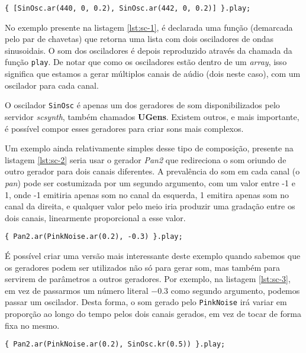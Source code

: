 \begin{lstlisting}[caption={Declaração de dois canais de aúdio com base em dois osciladores},label={lst:sc-1}]
{ [SinOsc.ar(440, 0, 0.2), SinOsc.ar(442, 0, 0.2)] }.play;
\end{lstlisting}

No exemplo presente na listagem \ref{lst:sc-1}, é declarada uma função (demarcada pelo par de chavetas) que retorna uma lista com dois osciladores de ondas sinusoidais. O som dos osciladores é depois reproduzido através da chamada da função \texttt{play}. De notar que como os osciladores estão dentro de um \textit{array}, isso significa que estamos a gerar múltiplos canais de aúdio (dois neste caso), com um oscilador para cada canal.

O oscilador \texttt{SinOsc} é apenas um dos geradores de som disponibilizados pelo servidor \textit{scsynth}, também chamados \textbf{UGens}. Existem outros, e mais importante, é possível compor esses geradores para criar sons mais complexos.

Um exemplo ainda relativamente simples desse tipo de composição, presente na listagem \ref{lst:sc-2} seria usar o gerador \textit{Pan2} que redireciona o som oriundo de outro gerador para dois canais diferentes. A prevalência do som em cada canal (o \textit{pan}) pode ser costumizada por um segundo argumento, com um valor entre -1 e 1, onde -1 emitiria apenas som no canal da esquerda, 1 emitira apenas som no canal da direita, e qualquer valor pelo meio iria produzir uma gradação entre os dois canais, linearmente proporcional a esse valor.

\begin{lstlisting}[caption={Dividir um gerador por dois canais de forma desigual},label={lst:sc-2}]
{ Pan2.ar(PinkNoise.ar(0.2), -0.3) }.play;
\end{lstlisting}

É possível criar uma versão mais interessante deste exemplo quando sabemos que os geradores podem ser utilizados não só para gerar som, mas também para servirem de parâmetros a outros geradores. Por exemplo, na listagem \ref{lst:sc-3}, em vez de passarmos um número literal $-0.3$ como segundo argumento, podemos passar um oscilador. Desta forma, o som gerado pelo \texttt{PinkNoise} irá variar em proporção ao longo do tempo pelos dois canais gerados, em vez de tocar de forma fixa no mesmo.

\begin{lstlisting}[caption={Dividir um gerador por dois canais de forma desigual},label={lst:sc-3}]
{ Pan2.ar(PinkNoise.ar(0.2), SinOsc.kr(0.5)) }.play;
\end{lstlisting}

